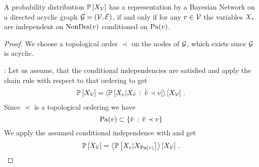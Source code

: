 \begin{theorem}
    \label{the:condIndBN}
    A probability distribution $\mathbb{P}\left[X_{\mathcal{V}}\right]$ has a representation by a Bayesian Network on a directed acyclic graph $\mathcal{G}=(\mathcal{V},\mathcal{E})$, if and only if for any $v\in\mathcal{V}$ the variables $X_{v}$ are independent on $\mathrm{NonDes}(v)$ conditioned on $\mathrm{Pa}(v)$.
\end{theorem}
\begin{proof}
    We choose a topological order $\prec$ on the nodes of $\mathcal{G}$, which exists since $\mathcal{G}$ is acyclic.

    \proofrightsymbol:
    Let us assume, that the conditional independencies are satisfied and apply the chain rule with respect to that ordering to get
    \begin{align*}
        \mathbb{P}\left[X_{\mathcal{V}}\right] =
        \left\langle 
            \mathbb{P}\left[X_{v}|X_{\tilde{v}} \,:\, \tilde{v} \prec v\right]
        \right\rangle \left[ X_{\mathcal{V}} \right] \, .
    \end{align*}
    Since $\prec$ is a topological ordering we have
    \[ \mathrm{Pa}(v) \subset \{\tilde{v} \,:\, \tilde{v} \prec v\} \]
    We apply the assumed conditional independence with  and get
    \begin{align*}
        \mathbb{P}\left[X_{\mathcal{V}}\right] =
        \left\langle 
            \mathbb{P}\left[X_{v}|X_{\mathrm{Pa}(v)}\right]
        \right\rangle \left[ X_{\mathcal{V}} \right] \, .
    \end{align*}


\end{proof}
